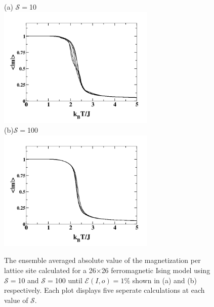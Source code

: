\documentclass[aps,prl,reprint,superscriptaddress,showkeys]{revtex4-1}
\begin{document}
\begin{figure}
(a)\hspace{0.1cm} $\mathcal{S}=$10\\
\includegraphics[width=7.5cm]{Fig4a.png}\\
(b)\hspace{0.1cm}$\mathcal{S}=$100\\
\includegraphics[width=7.5cm]{Fig4b.png}
\caption{\label{avg_mag} The ensemble averaged absolute value of the magnetization per lattice site calculated for a 26$\times$26 ferromagnetic Ising model  using $\mathcal{S}=$10 and $\mathcal{S}=$100 until $\mathcal{E}(I,o)=1\%$ shown in (a) and (b) respectively. Each plot displays five seperate calculations at each value of $\mathcal{S}$.  }
\end{figure}
\end{document}
